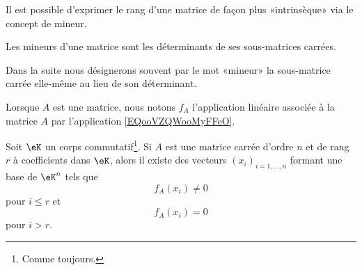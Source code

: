 Il est possible d'exprimer le rang d'une matrice de façon plus «intrinsèque» via le concept de mineur.
\begin{definition}
	Les mineurs d'une matrice sont les déterminants de ses sous-matrices carrées.
\end{definition}
Dans la suite nous désignerons souvent par le mot «mineur» la sous-matrice carrée elle-même au lieu de son déterminant.

Lorsque \( A\) est une matrice, nous notons \( f_A\) l'application linéaire associée à la matrice \( A\) par l'application \eqref{EQooVZQWooMyFFeO}.

\begin{lemma} \label{LEMVecsaRgFixe}
	Soit \( \eK \) un corps commutatif\footnote{Comme toujours.}. Si \( A \) est une matrice carrée d'ordre \( n \) et de rang \( r \) à coefficients dans \( \eK \), alors il existe des vecteurs \( (x_i)_{i=1,\dots,n} \) formant une base de \( \eK^n \) tels que
	\begin{equation}
		f_A(x_i)\neq 0
	\end{equation}
	pour \( i\leq r\) et
	\begin{equation}
		f_A(x_i) = 0
	\end{equation}
	pour \( i > r \).
\end{lemma}

